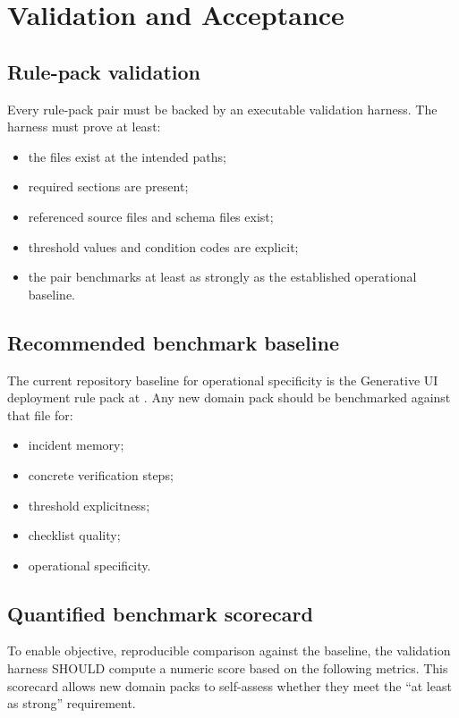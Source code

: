 \chapter{Validation and Acceptance}
\label{ch:validation}

\section{Rule-pack validation}

Every rule-pack pair must be backed by an executable validation harness.
The harness must prove at least:
\begin{itemize}
  \item the files exist at the intended paths;
  \item required sections are present;
  \item referenced source files and schema files exist;
  \item threshold values and condition codes are explicit;
  \item the pair benchmarks at least as strongly as the established
    operational baseline.
\end{itemize}

\section{Recommended benchmark baseline}

The current repository baseline for operational specificity is the
Generative UI deployment rule pack at
. Any new domain pack should be
benchmarked against that file for:
\begin{itemize}
  \item incident memory;
  \item concrete verification steps;
  \item threshold explicitness;
  \item checklist quality;
  \item operational specificity.
\end{itemize}

\section{Quantified benchmark scorecard}
\label{sec:benchmark-scorecard}

To enable objective, reproducible comparison against the baseline, the
validation harness SHOULD compute a numeric score based on the following
metrics. This scorecard allows new domain packs to self-assess whether
they meet the ``at least as strong'' requirement.

